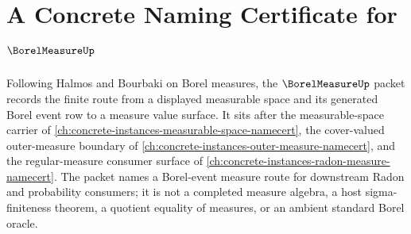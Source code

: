 \chapter{A Concrete Naming Certificate for $\BorelMeasureUp$}
\label{ch:concrete-instances-borel-measure-namecert}

Following Halmos and Bourbaki on Borel measures, the $\BorelMeasureUp$ packet records the finite route from a displayed measurable space and its generated Borel event row to a measure value surface. It sits after the measurable-space carrier of \autoref{ch:concrete-instances-measurable-space-namecert}, the cover-valued outer-measure boundary of \autoref{ch:concrete-instances-outer-measure-namecert}, and the regular-measure consumer surface of \autoref{ch:concrete-instances-radon-measure-namecert}. The packet names a Borel-event measure route for downstream Radon and probability consumers; it is not a completed measure algebra, a host sigma-finiteness theorem, a quotient equality of measures, or an ambient standard Borel oracle.

